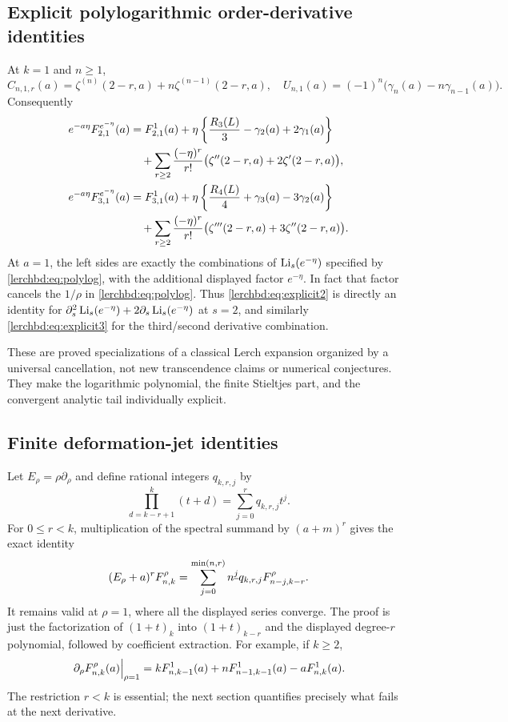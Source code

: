 \subsection{Explicit polylogarithmic order-derivative identities}
At $k=1$ and $n\ge1$,
\[
 C_{n,1,r}(a)=\zeta^{(n)}(2-r,a)+n\zeta^{(n-1)}(2-r,a),
 \quad U_{n,1}(a)=(-1)^n\bigl(\gamma_n(a)-n\gamma_{n-1}(a)\bigr).
\]
Consequently
\begin{align}
 e^{-a\eta}F_{2,1}^{e^{-\eta}}(a)
 &=F_{2,1}^{1}(a)
 +\eta\left\{\frac{R_3(L)}3-\gamma_2(a)+2\gamma_1(a)\right\}\notag\\
 &\quad+\sum_{r\ge2}\frac{(-\eta)^r}{r!}
  \bigl(\zeta''(2-r,a)+2\zeta'(2-r,a)\bigr),\label{lerchbd:eq:explicit2}\\
 e^{-a\eta}F_{3,1}^{e^{-\eta}}(a)
 &=F_{3,1}^{1}(a)
 +\eta\left\{\frac{R_4(L)}4+\gamma_3(a)-3\gamma_2(a)\right\}\notag\\
 &\quad+\sum_{r\ge2}\frac{(-\eta)^r}{r!}
  \bigl(\zeta'''(2-r,a)+3\zeta''(2-r,a)\bigr).\label{lerchbd:eq:explicit3}
\end{align}
At $a=1$, the left sides are exactly the combinations of $\operatorname{Li}_s(e^{-\eta})$ specified by \eqref{lerchbd:eq:polylog}, with the additional displayed factor $e^{-\eta}$. In fact that factor cancels the $1/\rho$ in \eqref{lerchbd:eq:polylog}. Thus \eqref{lerchbd:eq:explicit2} is directly an identity for
$\partial_s^2\operatorname{Li}_s(e^{-\eta})+2\partial_s\operatorname{Li}_s(e^{-\eta})$ at $s=2$, and similarly \eqref{lerchbd:eq:explicit3} for the third/second derivative combination.

These are proved specializations of a classical Lerch expansion organized by a universal cancellation, not new transcendence claims or numerical conjectures. They make the logarithmic polynomial, the finite Stieltjes part, and the convergent analytic tail individually explicit.

\subsection{Finite deformation-jet identities}
Let $E_\rho=\rho\partial_\rho$ and define rational integers $q_{k,r,j}$ by
\[
 \prod_{d=k-r+1}^{k}(t+d)=\sum_{j=0}^{r}q_{k,r,j}t^j.
\]
For $0\le r<k$, multiplication of the spectral summand by $(a+m)^r$ gives the exact identity
\begin{equation}\label{lerchbd:eq:jet}
 (E_\rho+a)^rF_{n,k}^{\rho}
 =\sum_{j=0}^{\min(n,r)}n^{\underline{j}} q_{k,r,j}F_{n-j,k-r}^{\rho}.
\end{equation}
It remains valid at $\rho=1$, where all the displayed series converge. The proof is just the factorization of $(1+t)_k$ into $(1+t)_{k-r}$ and the displayed degree-$r$ polynomial, followed by coefficient extraction. For example, if $k\ge2$,
\begin{equation}\label{lerchbd:eq:firstjet}
 \left.\partial_\rho F_{n,k}^{\rho}(a)\right|_{\rho=1}
 =kF_{n,k-1}^{1}(a)+nF_{n-1,k-1}^{1}(a)-aF_{n,k}^{1}(a).
\end{equation}
The restriction $r<k$ is essential; the next section quantifies precisely what fails at the next derivative.


